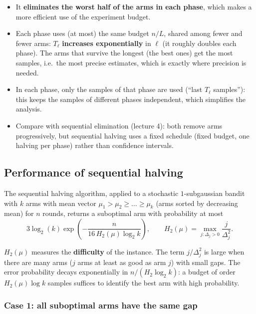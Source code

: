 \begin{remark}
\begin{itemize}
    \item It \textbf{eliminates the worst half of the arms in each phase}, which makes a more efficient use of the experiment budget.
    \item Each phase uses (at most) the same budget $n/L$, shared among fewer and fewer arms: $T_\ell$ \textbf{increases exponentially} in $\ell$ (it roughly doubles each phase). The arms that survive the longest (the best ones) get the most samples, i.e.\ the most precise estimates, which is exactly where precision is needed.
    \item In each phase, only the samples of that phase are used (``last $T_\ell$ samples''): this keeps the samples of different phases independent, which simplifies the analysis.
    \item Compare with sequential elimination (lecture 4): both remove arms progressively, but sequential halving uses a fixed schedule (fixed budget, one halving per phase) rather than confidence intervals.
\end{itemize}
\end{remark}

\subsection{Performance of sequential halving}

\begin{theorem}
The sequential halving algorithm, applied to a stochastic $1$-subgaussian bandit with $k$ arms with mean vector $\mu_1 > \mu_2 \geq \dots \geq \mu_k$ (arms sorted by decreasing mean) for $n$ rounds, returns a suboptimal arm with probability at most
\[
3\log_2(k)\exp\left(-\frac{n}{16\,H_2(\mu)\log_2 k}\right), \qquad H_2(\mu) = \max_{j:\Delta_j > 0} \frac{j}{\Delta_j^2}.
\]
\end{theorem}

\begin{remark}[Interpretation of $H_2$]
$H_2(\mu)$ measures the \textbf{difficulty} of the instance. The term $j/\Delta_j^2$ is large when there are many arms ($j$ arms at least as good as arm $j$) with small gaps. The error probability decays exponentially in $n/(H_2 \log_2 k)$: a budget of order $H_2(\mu)\log k$ samples suffices to identify the best arm with high probability.
\end{remark}

\subsubsection*{Case 1: all suboptimal arms have the same gap}

